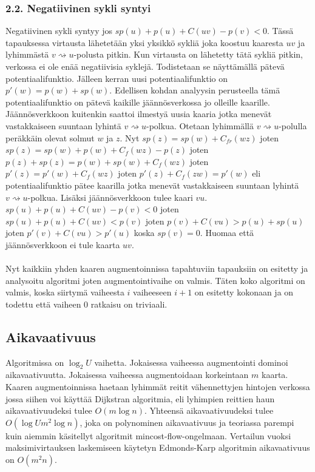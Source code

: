 \documentclass[a4paper, 11pt]{article}
\begin{document}
\subsubsection*{2.2. Negatiivinen sykli syntyi}
Negatiivinen sykli syntyy jos $sp(u) + p(u) + C(uv) - p(v) < 0$. Tässä tapauksessa 
virtausta lähetetään yksi yksikkö sykliä joka koostuu kaaresta $uv$ ja lyhimmästä
$v \rightsquigarrow u$-polusta pitkin. Kun virtausta on lähetetty tätä sykliä
pitkin, verkossa ei ole enää negatiivisia syklejä. Todistetaan se näyttämällä pätevä
potentiaalifunktio. Jälleen kerran uusi potentiaalifunktio on $p'(w) = p(w) + sp(w)$.
Edellisen kohdan analyysin perusteella tämä potentiaalifunktio on pätevä kaikille 
jäännösverkossa jo olleille kaarille. Jäännösverkkoon kuitenkin saattoi ilmestyä
uusia kaaria jotka menevät vastakkaiseen suuntaan lyhintä $v \rightsquigarrow u$-polkua.
Otetaan lyhimmällä $v \rightsquigarrow u$-polulla peräkkäin olevat solmut $w$ ja $z$.
Nyt $sp(z) = sp(w) + C_{fr}(wz)$ joten $sp(z) = sp(w) + p(w) + C_f(wz) - p(z)$ joten
$p(z) + sp(z) = p(w) + sp(w) + C_f(wz)$ joten $p'(z) = p'(w) + C_f(wz)$ joten 
$p'(z) + C_f(zw) = p'(w)$ eli potentiaalifunktio pätee kaarilla jotka menevät 
vastakkaiseen suuntaan lyhintä $v \rightsquigarrow u$-polkua. Lisäksi jäännösverkkoon
tulee kaari $vu$. $sp(u) + p(u) + C(uv) - p(v) < 0$ joten 
$sp(u) + p(u) + C(uv) < p(v)$ joten $p(v) + C(vu) > p(u) + sp(u)$ joten
$p'(v) + C(vu) > p'(u)$ koska $sp(v) = 0$. Huomaa että jäännösverkkoon ei tule kaarta
$uv$.
\\\\
\noindent
Nyt kaikkiin yhden kaaren augmentoinnissa tapahtuviin tapauksiin on esitetty ja analysoitu
algoritmi joten augmentointivaihe on valmis. Täten koko algoritmi on valmis, koska siirtymä
vaiheesta $i$ vaiheeseen $i+1$ on esitetty kokonaan ja on todettu että vaiheen 0 ratkaisu
on triviaali.
\subsection*{Aikavaativuus}
Algoritmissa on $\log_2 U$ vaihetta. Jokaisessa vaiheessa augmentointi dominoi aikavaativuutta.
Jokaisessa vaiheessa augmentoidaan korkeintaan
$m$ kaarta. Kaaren augmentoinnissa haetaan lyhimmät reitit vähennettyjen hintojen
verkossa jossa siihen voi käyttää Dijkstran algoritmia, eli lyhimpien reittien haun
aikavaativuudeksi tulee $O(m \log n)$. Yhteensä aikavaativuudeksi tulee $O(\log U m^2 \log n)$, joka
on polynominen aikavaativuus ja teoriassa parempi kuin aiemmin käsitellyt algoritmit mincost-flow-ongelmaan.
Vertailun vuoksi maksimivirtauksen laskemiseen käytetyn Edmonds-Karp algoritmin aikavaativuus
on $O(m^2n)$.
\end{document}
